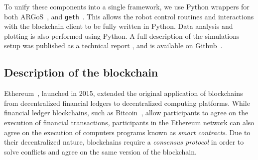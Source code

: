\documentclass[runningheads]{llncs}
\begin{document}
 To unify these components into a single framework, we use Python wrappers for both ARGoS~\cite{ken_argos_python}, and \texttt{geth}~\cite{web3py_2022}. This allows the robot control routines and interactions with the blockchain client to be fully written in Python. Data analysis and plotting is also performed using Python. A full description of the simulations setup was published as a technical report \cite{PacStrDor2020_techreport}, and is available on Github~\cite{teksander_argos_geth_github}.

\subsection{Description of the blockchain}
 Ethereum~\cite{buterin_2014_ethereum}, launched in 2015, extended the original application of blockchains from decentralized financial ledgers to decentralized computing platforms. While financial ledger blockchains, such as Bitcoin~\cite{bitcoin_online}, allow participants to agree on the execution of financial transactions, participants in the Ethereum network can also agree on the execution of computers programs known as \emph{smart contracts}. Due to their decentralized nature, blockchains require a \emph{consensus protocol} in order to solve conflicts and agree on the same version of the blockchain. %
\end{document}
